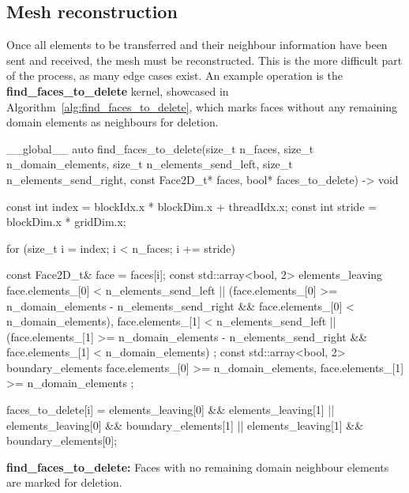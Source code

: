 \subsection{Mesh reconstruction}\label{subsection:load_balancing:implementation:reconstruction}

Once all elements to be transferred and their neighbour information have been sent and received, the
mesh must be reconstructed. This is the more difficult part of the process, as many edge cases
exist. An example operation is the \textbf{find\_faces\_to\_delete} kernel, showcased in
Algorithm~\ref{alg:find_faces_to_delete}, which marks faces without any remaining domain elements as
neighbours for deletion.

\begin{algorithm}[H]
    \begin{cuda}
        __global__
        auto find_faces_to_delete(size_t n_faces, size_t n_domain_elements, 
                size_t n_elements_send_left, size_t n_elements_send_right, 
                const Face2D_t* faces, bool* faces_to_delete) -> void {

            const int index = blockIdx.x * blockDim.x + threadIdx.x;
            const int stride = blockDim.x * gridDim.x;

            for (size_t i = index; i < n_faces; i += stride) {
                const Face2D_t& face = faces[i];
                const std::array<bool, 2> elements_leaving {
                    face.elements_[0] < n_elements_send_left 
                        || (face.elements_[0] >= n_domain_elements - n_elements_send_right 
                            && face.elements_[0] < n_domain_elements),
                    face.elements_[1] < n_elements_send_left 
                        || (face.elements_[1] >= n_domain_elements - n_elements_send_right 
                            && face.elements_[1] < n_domain_elements)
                };
                const std::array<bool, 2> boundary_elements {
                    face.elements_[0] >= n_domain_elements,
                    face.elements_[1] >= n_domain_elements
                };

                faces_to_delete[i] = elements_leaving[0] && elements_leaving[1] 
                                  || elements_leaving[0] && boundary_elements[1] 
                                  || elements_leaving[1] && boundary_elements[0];
            }
        }\end{cuda}
\caption{\textbf{find\_faces\_to\_delete:} Faces with no remaining domain neighbour elements are marked for deletion.}\label{alg:find_faces_to_delete}
\end{algorithm}

